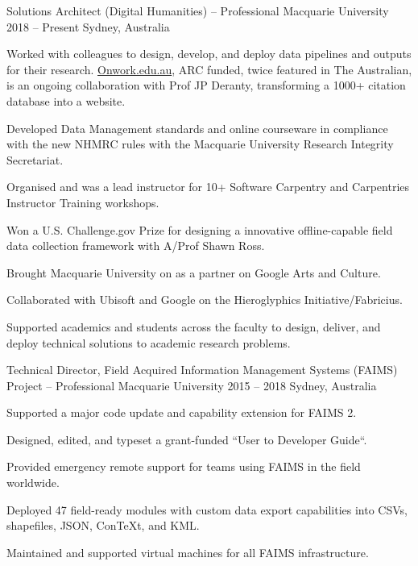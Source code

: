 

\begin{cventries}
\cventry
    {Solutions Architect (Digital Humanities) -- Professional} %
    {Macquarie University} %
    {2018 -- Present} %
    {Sydney, Australia} %
    {\begin{cvitems}%
    \item {Worked with colleagues to design, develop, and deploy data pipelines and outputs for their research. \href{https://onwork.edu.au}{Onwork.edu.au}, ARC funded, twice featured in The Australian, is an ongoing collaboration with Prof JP Deranty, transforming a 1000+ citation database into a website.}
    \item {Developed Data Management standards and online courseware in compliance with the new NHMRC rules with the Macquarie University Research Integrity Secretariat.}
    \item {Organised and was a lead instructor for 10+ Software Carpentry and Carpentries Instructor Training workshops.}
    \item {Won a U.S. Challenge.gov Prize for designing a innovative offline-capable field data collection framework with A/Prof Shawn Ross.}
    \item {Brought Macquarie University on as a partner on Google Arts and Culture.}
    \item {Collaborated with Ubisoft and Google on the Hieroglyphics Initiative/Fabricius.}
    \item {Supported academics and students across the faculty to design, deliver, and deploy technical solutions to academic research problems.}
    \end{cvitems}%
    }
    \cventry
    {Technical Director, Field Acquired Information Management Systems (FAIMS) Project -- Professional} %
    {Macquarie University} %
    {2015 -- 2018} %
    {Sydney, Australia} %
    {\begin{cvitems}%
    \item {Supported a major code update and capability extension for FAIMS 2.}
    \item {Designed, edited, and typeset a grant-funded ``User to Developer Guide``.}
    \item {Provided emergency remote support for teams using FAIMS in the field worldwide.}
    \item {Deployed 47 field-ready modules with custom data export capabilities into CSVs, shapefiles, JSON, Con\TeX{}t, and KML.}
    \item {Maintained and supported virtual machines for all FAIMS infrastructure.}
\end{cvitems}}
 

\end{cventries}
